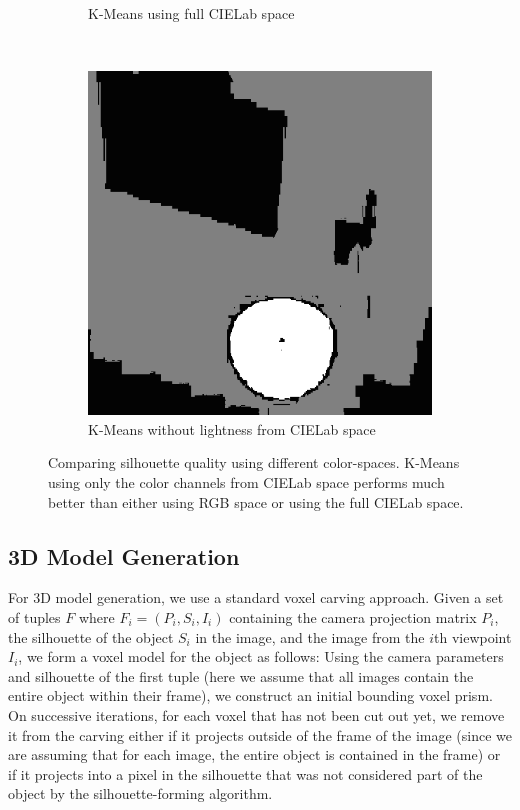 \documentclass[10pt,twocolumn,letterpaper]{article}
\begin{document}
\begin{figure}
\begin{subfigure}[t]{0.2\textwidth}
        \caption{K-Means using full CIELab space}
    \end{subfigure}
    ~ 
    \begin{subfigure}[t]{0.2\textwidth}
        \centering
        \includegraphics[width=\textwidth]{cluster_ids.png}
        \caption{K-Means without lightness from CIELab space}
    \end{subfigure}
    \caption{Comparing silhouette quality using different color-spaces. K-Means using only the color channels from CIELab space performs much better than either using RGB space or using the full CIELab space.}
    \label{bowl-lab-rgb}
\end{figure}


\subsection{3D Model Generation}

For 3D model generation, we use a standard voxel carving approach. Given a set of tuples $F$ where $F_i = (P_i, S_i, I_i)$ containing the camera projection matrix $P_i$, the silhouette of the object $S_i$ in the image, and the image from the $i$th viewpoint $I_i$, we form a voxel model for the object as follows: Using the camera parameters and silhouette of the first tuple (here we assume that all images contain the entire object within their frame), we construct an initial bounding voxel prism. On successive iterations, for each voxel that has not been cut out yet, we remove it from the carving either if it projects outside of the frame of the image (since we are assuming that for each image, the entire object is contained in the frame) or if it projects into a pixel in the silhouette that was not considered part of the object by the silhouette-forming algorithm.
\end{document}
